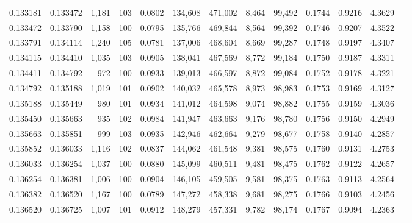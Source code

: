 \begin{tabular}{rrrrrrrrrrrrr}
0.133181 & 0.133472 & 1,181 & 103 &                                     0.0802 & 134,608 & 471,002 &   8,464 &  99,492 & 0.1744 & 0.9216 & 4.3629 \\
0.133472 & 0.133790 & 1,158 & 100 &                                     0.0795 & 135,766 & 469,844 &   8,564 &  99,392 & 0.1746 & 0.9207 & 4.3522 \\
0.133791 & 0.134114 & 1,240 & 105 &                                     0.0781 & 137,006 & 468,604 &   8,669 &  99,287 & 0.1748 & 0.9197 & 4.3407 \\
0.134115 & 0.134410 & 1,035 & 103 &                                     0.0905 & 138,041 & 467,569 &   8,772 &  99,184 & 0.1750 & 0.9187 & 4.3311 \\
0.134411 & 0.134792 &   972 & 100 &                                     0.0933 & 139,013 & 466,597 &   8,872 &  99,084 & 0.1752 & 0.9178 & 4.3221 \\
0.134792 & 0.135188 & 1,019 & 101 &                                     0.0902 & 140,032 & 465,578 &   8,973 &  98,983 & 0.1753 & 0.9169 & 4.3127 \\
0.135188 & 0.135449 &   980 & 101 &                                     0.0934 & 141,012 & 464,598 &   9,074 &  98,882 & 0.1755 & 0.9159 & 4.3036 \\
0.135450 & 0.135663 &   935 & 102 &                                     0.0984 & 141,947 & 463,663 &   9,176 &  98,780 & 0.1756 & 0.9150 & 4.2949 \\
0.135663 & 0.135851 &   999 & 103 &                                     0.0935 & 142,946 & 462,664 &   9,279 &  98,677 & 0.1758 & 0.9140 & 4.2857 \\
0.135852 & 0.136033 & 1,116 & 102 &                                     0.0837 & 144,062 & 461,548 &   9,381 &  98,575 & 0.1760 & 0.9131 & 4.2753 \\
0.136033 & 0.136254 & 1,037 & 100 &                                     0.0880 & 145,099 & 460,511 &   9,481 &  98,475 & 0.1762 & 0.9122 & 4.2657 \\
0.136254 & 0.136381 & 1,006 & 100 &                                     0.0904 & 146,105 & 459,505 &   9,581 &  98,375 & 0.1763 & 0.9113 & 4.2564 \\
0.136382 & 0.136520 & 1,167 & 100 &                                     0.0789 & 147,272 & 458,338 &   9,681 &  98,275 & 0.1766 & 0.9103 & 4.2456 \\
0.136520 & 0.136725 & 1,007 & 101 &                                     0.0912 & 148,279 & 457,331 &   9,782 &  98,174 & 0.1767 & 0.9094 & 4.2363 \\

\end{tabular}
